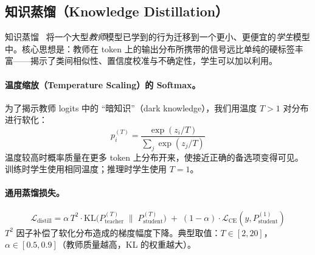 \subsection{知识蒸馏（Knowledge Distillation）}
\label{knowledge-distillation}

知识蒸馏~\cite{hinton2015distilling} 将一个大型\emph{教师}模型已学到的行为迁移到一个更小、更便宜的\emph{学生}模型中。核心思想是：教师在 token 上的输出分布所携带的信号远比单纯的硬标签丰富——揭示了类间相似性、置信度校准与不确定性，学生可以加以利用。

\paragraph{温度缩放（Temperature Scaling）的 Softmax。}
\label{temperature-scaled-softmax.}

为了揭示教师 logits 中的 ``暗知识''（dark knowledge），我们用温度 $T > 1$ 对分布进行软化：
\[
p_i^{(T)} = \frac{\exp(z_i / T)}{\sum_j \exp(z_j / T)}
\]
温度较高时概率质量在更多 token 上分布开来，使接近正确的备选项变得可见。训练时学生使用相同温度；推理时学生使用 $T=1$。

\paragraph{通用蒸馏损失。}
\label{general-distillation-loss.}

\[
\mathcal{L}_{\text{distill}} = \alpha \, T^2 \cdot \text{KL}\!\bigl(P_{\text{teacher}}^{(T)} \;\|\; P_{\text{student}}^{(T)}\bigr) \;+\; (1-\alpha) \cdot \mathcal{L}_{\text{CE}}(y, P_{\text{student}}^{(1)})
\]
$T^2$ 因子补偿了软化分布造成的梯度幅度下降。典型取值：$T \in [2, 20]$，$\alpha \in [0.5, 0.9]$（教师质量越高，KL 的权重越大）。

